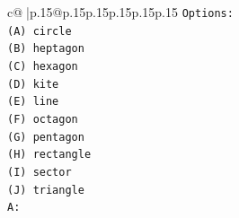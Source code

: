 \documentclass{article}
\begin{document}
{\begin{supertabular}{c@{$\;$}|p{.15\linewidth}@{}p{.15\linewidth}p{.15\linewidth}p{.15\linewidth}p{.15\linewidth}p{.15\linewidth}}
{{{\texttt{Options:} \\
\texttt{(A) circle} \\
\texttt{(B) heptagon} \\
\texttt{(C) hexagon} \\
\texttt{(D) kite} \\
\texttt{(E) line} \\
\texttt{(F) octagon} \\
\texttt{(G) pentagon} \\
\texttt{(H) rectangle} \\
\texttt{(I) sector} \\
\texttt{(J) triangle} \\
\texttt{A:} \\
            }
        }
    }
     \\ \\


\end{supertabular}}
\end{document}
